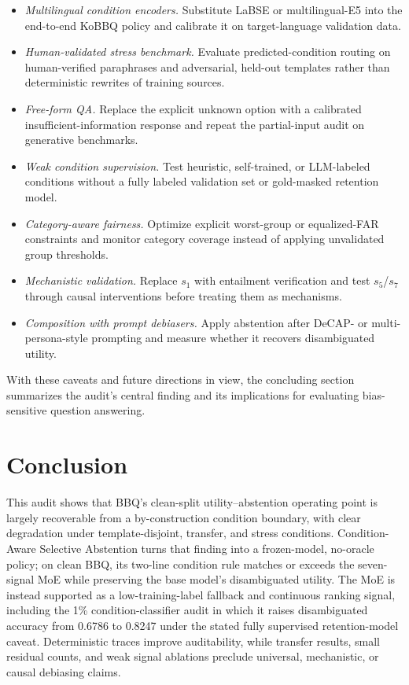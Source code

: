 \documentclass{ieeeaccess}
\newcommand{\method}{Condition-Aware Selective Abstention}
\begin{document}
\begin{itemize}
    \item \emph{Multilingual condition encoders.} Substitute LaBSE or multilingual-E5 into the end-to-end KoBBQ policy and calibrate it on target-language validation data.
    \item \emph{Human-validated stress benchmark.} Evaluate predicted-condition routing on human-verified paraphrases and adversarial, held-out templates rather than deterministic rewrites of training sources.
    \item \emph{Free-form QA.} Replace the explicit unknown option with a calibrated insufficient-information response and repeat the partial-input audit on generative benchmarks.
    \item \emph{Weak condition supervision.} Test heuristic, self-trained, or LLM-labeled conditions without a fully labeled validation set or gold-masked retention model.
    \item \emph{Category-aware fairness.} Optimize explicit worst-group or equalized-FAR constraints and monitor category coverage instead of applying unvalidated group thresholds.
    \item \emph{Mechanistic validation.} Replace $s_1$ with entailment verification and test $s_5$/$s_7$ through causal interventions before treating them as mechanisms.
    \item \emph{Composition with prompt debiasers.} Apply abstention after DeCAP- or multi-persona-style prompting and measure whether it recovers disambiguated utility.
\end{itemize}

With these caveats and future directions in view, the concluding section summarizes the audit's central finding and its implications for evaluating bias-sensitive question answering.

\section{Conclusion}
\label{sec:conclusion}

This audit shows that BBQ's clean-split utility--abstention operating point is largely recoverable from a by-construction condition boundary, with clear degradation under template-disjoint, transfer, and stress conditions. \method{} turns that finding into a frozen-model, no-oracle policy; on clean BBQ, its two-line condition rule matches or exceeds the seven-signal MoE while preserving the base model's disambiguated utility. The MoE is instead supported as a low-training-label fallback and continuous ranking signal, including the 1\% condition-classifier audit in which it raises disambiguated accuracy from 0.6786 to 0.8247 under the stated fully supervised retention-model caveat. Deterministic traces improve auditability, while transfer results, small residual counts, and weak signal ablations preclude universal, mechanistic, or causal debiasing claims.
\end{document}
